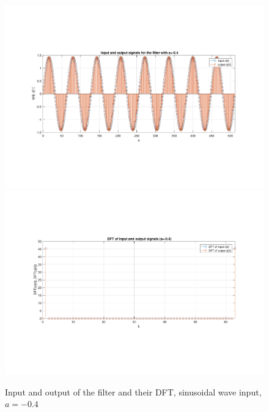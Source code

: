 \begin{figure} [H]
	\centering
	\includegraphics[trim={2.5cm 5cm 2.5cm 5cm}, clip, width=0.75\linewidth]{io_sin_3}
	\includegraphics[trim={2.5cm 5cm 2.5cm 5cm}, clip, width=0.75\linewidth]{dft_sin_3}
		\caption{Input and output of the filter and their DFT, sinusoidal wave input, $a=-0.4$}
	\label{fig:t1_io_sin_3}
\end{figure}
